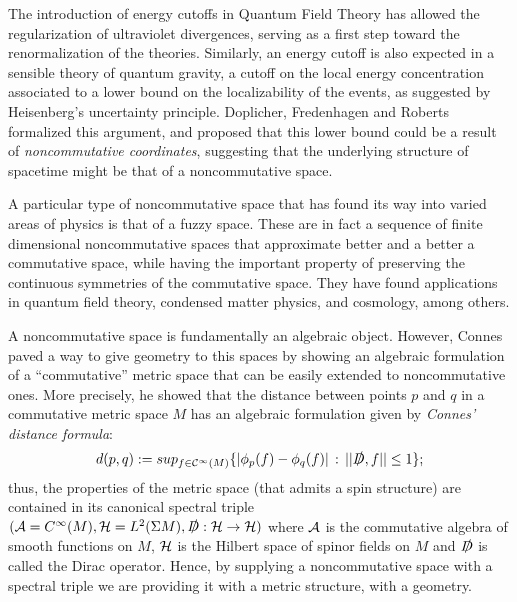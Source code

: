 The introduction of energy cutoffs in Quantum Field Theory has allowed the regularization of ultraviolet divergences, serving as a first step toward the renormalization of the theories. Similarly, an energy cutoff is also expected in a sensible theory of quantum gravity, a cutoff on the local energy concentration associated to a lower bound on the localizability of the events, as suggested by Heisenberg's uncertainty principle. Doplicher, Fredenhagen and Roberts \cite{DFR} formalized this argument, and proposed that this lower bound could be a result of \textit{noncommutative coordinates}, suggesting that the underlying structure of spacetime might be that of a noncommutative space.

A particular type of noncommutative space that has found its way into varied areas of physics is that of a fuzzy space. These are in fact a sequence of finite dimensional noncommutative spaces that approximate better and a better a commutative space, while having the important property of preserving the continuous symmetries of the commutative space. They have found applications in quantum field theory, condensed matter physics, and  cosmology, among others.

A noncommutative space is fundamentally an algebraic object. However, Connes \cite{Connes1994} paved a way to give geometry to this spaces by showing an algebraic formulation of a ``commutative'' metric space that can be easily extended to noncommutative ones. More precisely, he showed that the distance between points $p$ and $q$ in a commutative metric space $M$ has an algebraic formulation given by \textit{Connes' distance formula}: 
\begin{equation}
    d(p, q) := sup_{f \in \mathcal C^\infty(M)}\{ |\phi_p(f) - \phi_q(f)| \,:\,  ||\slashed D, f|| \leq 1 \};
\end{equation}
thus, the properties of the metric space (that admits a spin structure) are contained in its canonical spectral triple $(\mathcal A = C^\infty(M), \mathcal H = L^2(\Sigma M), \slashed D: \mathcal H \to \mathcal H)$ where $\mathcal A$ is the commutative algebra of smooth functions on $M$, $\mathcal H$ is the Hilbert space of spinor fields on $M$ and $\slashed D$ is called the Dirac operator. Hence, by supplying a noncommutative space with a spectral triple we are providing it with a metric structure, with a geometry.

